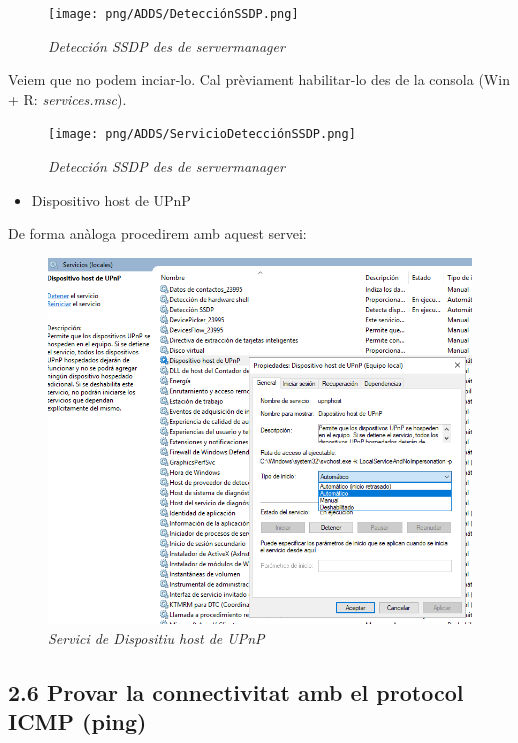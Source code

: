 \documentclass[
  a4paper,
]{article}
\providecommand{\tightlist}{%
  \setlength{\itemsep}{0pt}\setlength{\parskip}{0pt}}
\begin{document}
\begin{figure}
\centering
\texttt{[image: png/ADDS/DetecciónSSDP.png]}
\caption{\emph{Detección SSDP des de servermanager}}
\end{figure}

Veiem que no podem inciar-lo. Cal prèviament habilitar-lo des de la
consola (Win + R: \emph{services.msc}).

\begin{figure}
\centering
\texttt{[image: png/ADDS/ServicioDetecciónSSDP.png]}
\caption{\emph{Detección SSDP des de servermanager}}
\end{figure}

\begin{itemize}
\tightlist
\item
  Dispositivo host de UPnP
\end{itemize}

De forma anàloga procedirem amb aquest servei:

\begin{figure}
\centering
\includegraphics{png/ADDS/ServicioDispositivoUPnP.png}
\caption{\emph{Servici de Dispositiu host de UPnP}}
\end{figure}

\subsection{2.6 Provar la connectivitat amb el protocol ICMP
(ping)}\label{provar-la-connectivitat-amb-el-protocol-icmp-ping}
\end{document}
